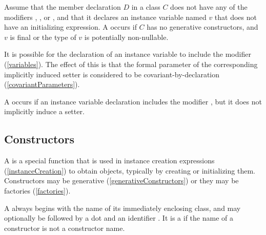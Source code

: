 \documentclass[makeidx]{article}
\begin{document}
\LMHash{}%
Assume that the member declaration $D$ in a class $C$
does not have any of the modifiers \LATE, \ABSTRACT, or \EXTERNAL,
and that it declares an instance variable named $v$
that does not have an initializing expression.
A  occurs if $C$ has no generative constructors,
and $v$ is final or the type of $v$ is potentially non-nullable.

\LMHash{}%
It is possible for the declaration of an instance variable
to include the modifier \COVARIANT{}
(\ref{variables}).
The effect of this is that the formal parameter of
the corresponding implicitly induced setter
is considered to be covariant-by-declaration
(\ref{covariantParameters}).

\LMHash{}%
A  occurs if an instance variable declaration
includes the modifier \COVARIANT,
but it does not implicitly induce a setter.



\subsection{Constructors}

\LMHash{}%
A  is a special function that is used
in instance creation expressions (\ref{instanceCreation}) to obtain objects,
typically by creating or initializing them.
Constructors may be generative (\ref{generativeConstructors})
or they may be factories (\ref{factories}).

\LMHash{}%
A  always begins with
the name of its immediately enclosing class,
and may optionally be followed by a dot and an identifier \id.
It is a  if the name of a constructor
is not a constructor name.
\end{document}
